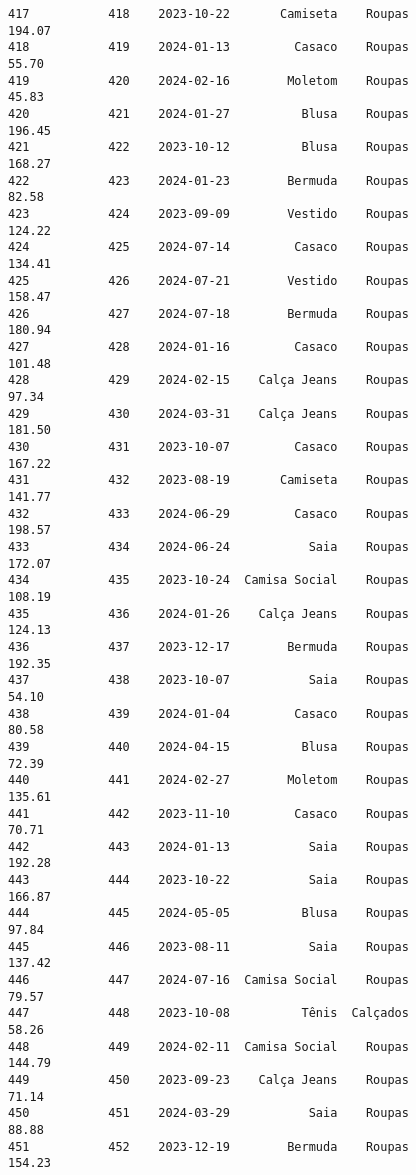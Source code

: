 \documentclass[11pt]{article}
\begin{document}
\begin{Verbatim}[commandchars=\\\{\}]
417           418    2023-10-22       Camiseta    Roupas          194.07   
418           419    2024-01-13         Casaco    Roupas           55.70   
419           420    2024-02-16        Moletom    Roupas           45.83   
420           421    2024-01-27          Blusa    Roupas          196.45   
421           422    2023-10-12          Blusa    Roupas          168.27   
422           423    2024-01-23        Bermuda    Roupas           82.58   
423           424    2023-09-09        Vestido    Roupas          124.22   
424           425    2024-07-14         Casaco    Roupas          134.41   
425           426    2024-07-21        Vestido    Roupas          158.47   
426           427    2024-07-18        Bermuda    Roupas          180.94   
427           428    2024-01-16         Casaco    Roupas          101.48   
428           429    2024-02-15    Calça Jeans    Roupas           97.34   
429           430    2024-03-31    Calça Jeans    Roupas          181.50   
430           431    2023-10-07         Casaco    Roupas          167.22   
431           432    2023-08-19       Camiseta    Roupas          141.77   
432           433    2024-06-29         Casaco    Roupas          198.57   
433           434    2024-06-24           Saia    Roupas          172.07   
434           435    2023-10-24  Camisa Social    Roupas          108.19   
435           436    2024-01-26    Calça Jeans    Roupas          124.13   
436           437    2023-12-17        Bermuda    Roupas          192.35   
437           438    2023-10-07           Saia    Roupas           54.10   
438           439    2024-01-04         Casaco    Roupas           80.58   
439           440    2024-04-15          Blusa    Roupas           72.39   
440           441    2024-02-27        Moletom    Roupas          135.61   
441           442    2023-11-10         Casaco    Roupas           70.71   
442           443    2024-01-13           Saia    Roupas          192.28   
443           444    2023-10-22           Saia    Roupas          166.87   
444           445    2024-05-05          Blusa    Roupas           97.84   
445           446    2023-08-11           Saia    Roupas          137.42   
446           447    2024-07-16  Camisa Social    Roupas           79.57   
447           448    2023-10-08          Tênis  Calçados           58.26   
448           449    2024-02-11  Camisa Social    Roupas          144.79   
449           450    2023-09-23    Calça Jeans    Roupas           71.14   
450           451    2024-03-29           Saia    Roupas           88.88   
451           452    2023-12-19        Bermuda    Roupas          154.23   

\end{Verbatim}
\end{document}
